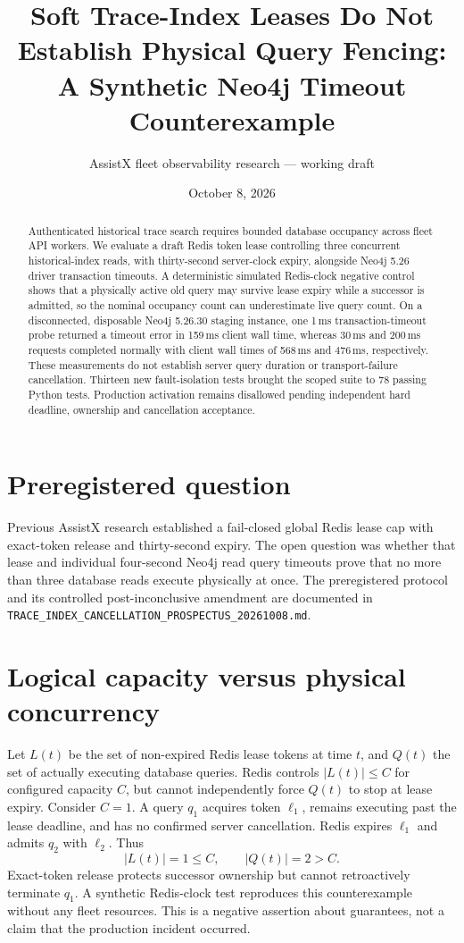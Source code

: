 \documentclass[11pt]{article}
\title{Soft Trace-Index Leases Do Not Establish Physical Query Fencing:\\ A Synthetic Neo4j Timeout Counterexample}
\author{AssistX fleet observability research --- working draft}
\date{October 8, 2026}
\begin{document}
\maketitle
\begin{abstract}
Authenticated historical trace search requires bounded database occupancy across fleet API workers. We evaluate a draft Redis token lease controlling three concurrent historical-index reads, with thirty-second server-clock expiry, alongside Neo4j 5.26 driver transaction timeouts. A deterministic simulated Redis-clock negative control shows that a physically active old query may survive lease expiry while a successor is admitted, so the nominal occupancy count can underestimate live query count. On a disconnected, disposable Neo4j 5.26.30 staging instance, one 1\,ms transaction-timeout probe returned a timeout error in 159\,ms client wall time, whereas 30\,ms and 200\,ms requests completed normally with client wall times of 568\,ms and 476\,ms, respectively. These measurements do not establish server query duration or transport-failure cancellation. Thirteen new fault-isolation tests brought the scoped suite to 78 passing Python tests. Production activation remains disallowed pending independent hard deadline, ownership and cancellation acceptance.
\end{abstract}
\section{Preregistered question}
Previous AssistX research established a fail-closed global Redis lease cap with exact-token release and thirty-second expiry. The open question was whether that lease and individual four-second Neo4j read query timeouts prove that no more than three database reads execute physically at once. The preregistered protocol and its controlled post-inconclusive amendment are documented in \texttt{TRACE\_INDEX\_CANCELLATION\_PROSPECTUS\_20261008.md}.
\section{Logical capacity versus physical concurrency}
Let $L(t)$ be the set of non-expired Redis lease tokens at time $t$, and $Q(t)$ the set of actually executing database queries. Redis controls $|L(t)|\leq C$ for configured capacity $C$, but cannot independently force $Q(t)$ to stop at lease expiry. Consider $C=1$. A query $q_1$ acquires token $\ell_1$, remains executing past the lease deadline, and has no confirmed server cancellation. Redis expires $\ell_1$ and admits $q_2$ with $\ell_2$. Thus
\[
|L(t)|=1\leq C,\qquad |Q(t)|=2>C.
\]
Exact-token release protects successor ownership but cannot retroactively terminate $q_1$. A synthetic Redis-clock test reproduces this counterexample without any fleet resources. This is a negative assertion about guarantees, not a claim that the production incident occurred.
\end{document}
